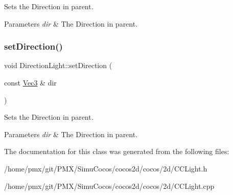 Sets the Direction in parent.


\begin{DoxyParams}{Parameters}
{\em dir} & The Direction in parent. \\
\hline
\end{DoxyParams}
\mbox{\label{classDirectionLight_a2a14a017012b2d1b76a25852f7c16e0a}} 
\subsubsection{\texorpdfstring{set\+Direction()}{setDirection()}\hspace{0.1cm}{\footnotesize\ttfamily [2/2]}}
{\footnotesize\ttfamily void Direction\+Light\+::set\+Direction (\begin{DoxyParamCaption}\item[{const \hyperlink{classVec3}{Vec3} \&}]{dir }\end{DoxyParamCaption})}

Sets the Direction in parent.


\begin{DoxyParams}{Parameters}
{\em dir} & The Direction in parent. \\
\hline
\end{DoxyParams}


The documentation for this class was generated from the following files\+:\begin{DoxyCompactItemize}
\item 
/home/pmx/git/\+P\+M\+X/\+Simu\+Cocos/cocos2d/cocos/2d/C\+C\+Light.\+h\item 
/home/pmx/git/\+P\+M\+X/\+Simu\+Cocos/cocos2d/cocos/2d/C\+C\+Light.\+cpp\end{DoxyCompactItemize}
